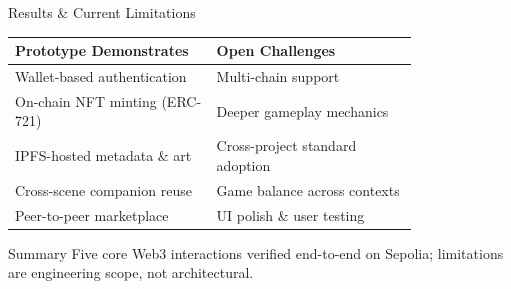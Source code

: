 \documentclass[aspectratio=169, 10pt]{beamer}
\newcommand{\pos}[1]{\textcolor{positive}{#1}}
\newcommand{\con}[1]{\textcolor{negative}{#1}}
\begin{document}
\begin{frame}{Results \& Current Limitations}
  \centering
  \vspace{0.1cm}
  \begin{tabular}{
    >{\raggedright}p{0.40\linewidth}
    >{\raggedright\arraybackslash}p{0.40\linewidth}}
    \toprule
    \textbf{\pos{Prototype Demonstrates}} & \textbf{\con{Open Challenges}} \\
    \midrule
    Wallet-based authentication    & Multi-chain support \\
    On-chain NFT minting (ERC-721) & Deeper gameplay mechanics \\
    IPFS-hosted metadata \& art    & Cross-project standard adoption \\
    Cross-scene companion reuse    & Game balance across contexts \\
    Peer-to-peer marketplace       & UI polish \& user testing \\
    \bottomrule
  \end{tabular}
  \vspace{0.3cm}
  \begin{block}{Summary}
    Five core Web3 interactions verified end-to-end on Sepolia;
    limitations are engineering scope, not architectural.
  \end{block}
\end{frame}
\end{document}
